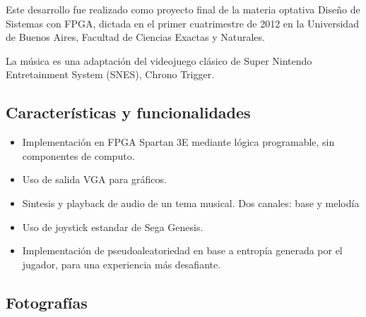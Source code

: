 \documentclass[10pt, a4paper,english,spanish]{article}
\begin{document}
Este desarrollo fue realizado como proyecto final de la materia optativa
Diseño de Sistemas con FPGA, dictada en el primer cuatrimestre de 2012
en la Universidad de Buenos Aires, Facultad de Ciencias Exactas y
Naturales.

La música es una adaptación del videojuego clásico de Super Nintendo
Entretainment System (SNES), Chrono Trigger.

\subsection{Caracter\'isticas y funcionalidades}

\begin{itemize}
	\item Implementación en FPGA Spartan 3E mediante lógica programable, sin 
	componentes de computo.
	\item Uso de salida VGA para gráficos.
	\item Sintesis y playback de audio de un tema musical. Dos canales: base y
	melod\'ia
	\item Uso de joystick estandar de Sega Genesis.
	\item Implementación de pseudoaleatoriedad en base a entropía generada por 
	el jugador, para una experiencia más desafiante.
\end{itemize}

\subsection{Fotograf\'ias}
\end{document}
